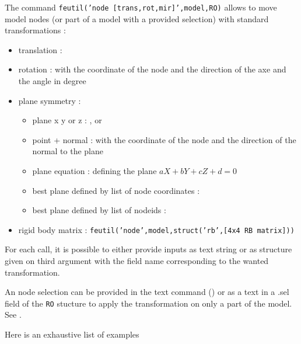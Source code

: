 
The command {\tt feutil('node [trans,rot,mir]',model,RO)} allows to move model nodes (or part of a model with a provided selection) with standard transformations :

\begin{itemize}
\item translation :  
\item rotation :   with  the coordinate of the node and  the direction of the axe and  the angle in degree 
\item plane symmetry : 
\begin{itemize}
\item plane x y or z :  ,   or  
\item point + normal :   with  the coordinate of the node and  the direction of the normal to the plane
\item plane equation :   defining the plane $aX+bY+cZ+d=0$
\item best plane defined by list of node coordinates : 
\item best plane defined by list of nodeids :  
\end{itemize}
\item rigid body matrix : {\tt feutil('node',model,struct('rb',[4x4 RB matrix]))}
\end{itemize}

For each call, it is possible to either provide inputs as text string or as structure given on third argument with the field name corresponding to the wanted transformation. 

An node selection can be provided in the text command () or as a text in a {.sel} field of the {\tt RO} stucture to apply the transformation on only a part of the model. See .

Here is an exhaustive list of examples

